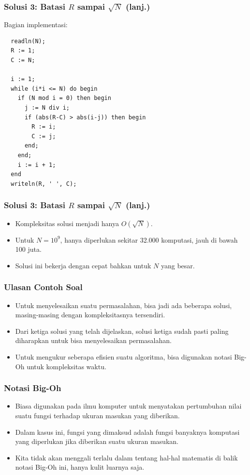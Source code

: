 \documentclass{beamer}
\begin{document}
\begin{frame}[fragile]
\frametitle{Solusi 3: Batasi $R$ sampai $\sqrt{N}$ (lanj.)}
Bagian implementasi:
\begin{lstlisting}
  readln(N);
  R := 1;
  C := N;

  i := 1;
  while (i*i <= N) do begin
    if (N mod i = 0) then begin
      j := N div i;
      if (abs(R-C) > abs(i-j)) then begin
        R := i;
        C := j;
      end;
    end;
    i := i + 1;
  end
  writeln(R, ' ', C);
\end{lstlisting}
\end{frame}

\begin{frame}[fragile]
\frametitle{Solusi 3: Batasi $R$ sampai $\sqrt{N}$ (lanj.)}
\begin{itemize}
  \item Kompleksitas solusi menjadi hanya $O(\sqrt{N})$.
  \item Untuk $N = 10^9$, hanya diperlukan sekitar 32.000 komputasi, jauh di bawah 100 juta.
  \item Solusi ini bekerja dengan cepat bahkan untuk $N$ yang besar.
\end{itemize}
\end{frame}

\begin{frame}
\frametitle{Ulasan Contoh Soal}
\begin{itemize}
  \item Untuk menyelesaikan suatu permasalahan, bisa jadi ada beberapa solusi, masing-masing dengan kompleksitasnya tersendiri.
  \item Dari ketiga solusi yang telah dijelaskan, solusi ketiga sudah pasti paling diharapkan untuk bisa menyelesaikan permasalahan.
  \item Untuk mengukur seberapa efisien suatu algoritma, bisa digunakan notasi Big-Oh untuk kompleksitas waktu.
\end{itemize}
\end{frame}

\begin{frame}
\frametitle{Notasi Big-Oh}
\begin{itemize}
  \item Biasa digunakan pada ilmu komputer untuk menyatakan pertumbuhan nilai suatu fungsi terhadap ukuran masukan yang diberikan.
  \item Dalam kasus ini, fungsi yang dimaksud adalah fungsi banyaknya komputasi yang diperlukan jika diberikan suatu ukuran masukan.
  \item Kita tidak akan menggali terlalu dalam tentang hal-hal matematis di balik notasi Big-Oh ini, hanya kulit luarnya saja.
\end{itemize}
\end{frame}
\end{document}
